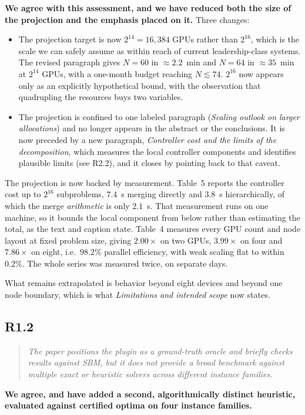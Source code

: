 \documentclass[11pt,a4paper]{article}
\newenvironment{reviewercomment}
  {\begin{quote}\itshape\small}
  {\end{quote}}
\newcommand{\point}[2]{%
  \subsection*{#1}%
  \begin{reviewercomment}#2\end{reviewercomment}}
\begin{document}
\textbf{We agree with this assessment, and we have reduced both the size of the projection
 and the emphasis placed on it.}
Three changes:

\begin{itemize}[leftmargin=*]
\item The projection target is now $2^{14}=16{,}384$ GPUs rather than $2^{16}$, which is the
scale we can safely assume as within reach of current leadership-class systems. The revised paragraph
gives $N=60$ in $\approx\!2.2$~min and $N=64$ in $\approx\!35$~min at $2^{14}$ GPUs, with a
one-month budget reaching $N \lesssim 74$. $2^{16}$ now appears only as an explicitly
hypothetical bound, with the observation that quadrupling the resources buys two variables.
\item The projection is confined to one labeled paragraph (\emph{Scaling outlook on larger
allocations}) and no longer appears in the abstract or the conclusions. It is now preceded by a
new paragraph, \emph{Controller cost and the limits of the decomposition}, which measures the
local controller components and identifies plausible limits (see R2.2), and it closes by
pointing back to that caveat.
\end{itemize}

The projection is now backed by measurement. Table~5 reports the
controller cost up to $2^{16}$ subproblems, $7.4$~s merging directly and $3.8$~s
hierarchically, of which the merge \emph{arithmetic} is only $2.1$~s. That measurement runs on
one machine, so it bounds the local component from below rather than estimating the total, as
the text and caption state. Table~4 measures every GPU count and node layout at fixed problem
size, giving $2.00\times$ on two GPUs, $3.99\times$ on four and $7.86\times$ on eight, i.e.\
$98.2\%$ parallel efficiency, with weak scaling flat to within $0.2\%$. The whole series was
measured twice, on separate days.

What remains extrapolated is behavior beyond eight devices and beyond one node boundary,
which is what \emph{Limitations and intended scope} now states.

\point{R1.2}{The paper positions the plugin as a ground-truth oracle and briefly checks results
against SBM, but it does not provide a broad benchmark against multiple exact or heuristic
solvers across different instance families.}

\textbf{We agree, and have added a second, algorithmically distinct heuristic, evaluated
against certified optima on four instance families.}
\end{document}

